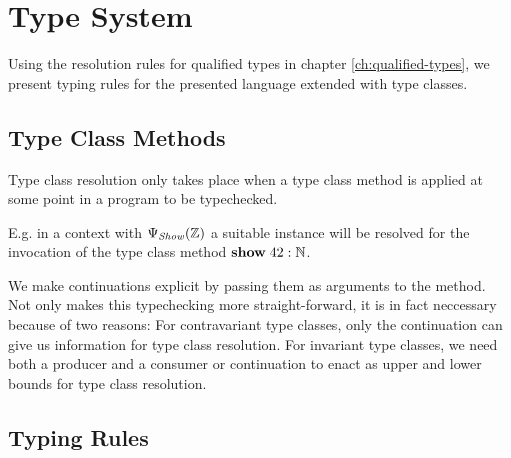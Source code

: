 \chapter{Type System}
\label{ch:type-system}

Using the resolution rules for qualified types in chapter \ref{ch:qualified-types}, we present typing rules for the presented language extended with type classes.

\section{Type Class Methods}

Type class resolution only takes place when a type class method is applied at some point in a program to be typechecked.

E.g. in a context with $\Psi_\mathit{Show}(\mathbb{Z})$ a suitable instance will be resolved for the invocation of the type class method ${\bf show} \; 42 : \mathbb{N}$.

We make continuations explicit by passing them as arguments to the method.
Not only makes this typechecking more straight-forward, it is in fact neccessary because of two reasons:
For contravariant type classes, only the continuation can give us information for type class resolution.
For invariant type classes, we need both a producer and a consumer or continuation to enact as upper and lower bounds for type class resolution.

\section{Typing Rules}

